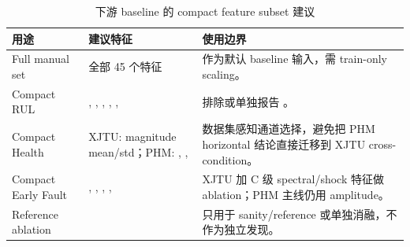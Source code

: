 \begin{table}[htbp]
\centering
\caption{下游 baseline 的 compact feature subset 建议}
\label{tab:compact_baseline_suggestions}
\scriptsize
\begin{tabularx}{\textwidth}{lYY}
\toprule
用途 & 建议特征 & 使用边界 \\
\midrule
Full manual set &  全部 45 个特征 & 作为默认 baseline 输入，需 train-only scaling。\\
Compact RUL & , , , , ,  & 排除或单独报告 。\\
Compact Health & XJTU: magnitude mean/std；PHM: , ,  & 数据集感知通道选择，避免把 PHM horizontal 结论直接迁移到 XJTU cross-condition。\\
Compact Early Fault & , , , ,  & XJTU 加 C 级 spectral/shock 特征做 ablation；PHM 主线仍用 amplitude。\\
Reference ablation &  & 只用于 sanity/reference 或单独消融，不作为独立发现。\\
\bottomrule
\end{tabularx}
\end{table}
